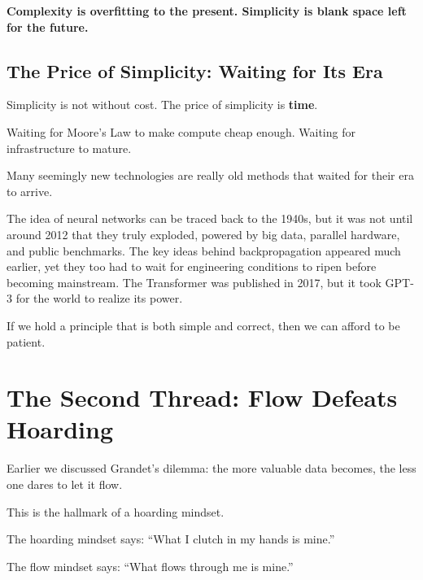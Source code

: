\vspace{1em}

\textbf{Complexity is overfitting to the present. Simplicity is blank space left for the future.}

\subsection{The Price of Simplicity: Waiting for Its Era}

Simplicity is not without cost. The price of simplicity is \textbf{time}.

Waiting for Moore's Law to make compute cheap enough. Waiting for infrastructure to mature.

\vspace{1em}

Many seemingly new technologies are really old methods that waited for their era to arrive.

The idea of neural networks can be traced back to the 1940s, but it was not until around 2012 that they truly exploded, powered by big data, parallel hardware, and public benchmarks. The key ideas behind backpropagation appeared much earlier, yet they too had to wait for engineering conditions to ripen before becoming mainstream.
The Transformer was published in 2017, but it took GPT-3 for the world to realize its power.

\vspace{1em}

If we hold a principle that is both simple and correct, then we can afford to be patient.

\newpage
\section{The Second Thread: Flow Defeats Hoarding}



Earlier we discussed Grandet's dilemma: the more valuable data becomes, the less one dares to let it flow.

This is the hallmark of a hoarding mindset.

The hoarding mindset says: ``What I clutch in my hands is mine.''

The flow mindset says: ``What flows through me is mine.''

